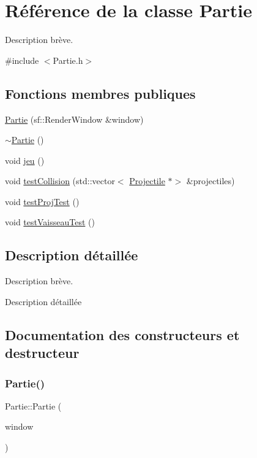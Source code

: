 \hypertarget{class_partie}{}\section{Référence de la classe Partie}
\label{class_partie}


Description brève.  




{\ttfamily \#include $<$Partie.\+h$>$}

\subsection*{Fonctions membres publiques}
\begin{DoxyCompactItemize}
\item 
\hyperlink{class_partie_a4ff8a252d0ca57f42abb2285cf5ad2e0}{Partie} (sf\+::\+Render\+Window \&window)
\item 
\hyperlink{class_partie_ae4afeb7336bb84427272cfb7018b5e3d}{$\sim$\+Partie} ()
\item 
void \hyperlink{class_partie_a38d54358098b3e5e47d0059a37bff5ea}{jeu} ()
\item 
void \hyperlink{class_partie_aae0457a6d531a2c2da83463a7fa66574}{test\+Collision} (std\+::vector$<$ \hyperlink{class_projectile}{Projectile} $\ast$$>$ \&projectiles)
\item 
void \hyperlink{class_partie_a6f27ab32773454f2d44a1cf3ef95ba47}{test\+Proj\+Test} ()
\item 
void \hyperlink{class_partie_ad9ed353f340b606840fe4053ab7b6bf3}{test\+Vaisseau\+Test} ()
\end{DoxyCompactItemize}


\subsection{Description détaillée}
Description brève. 

Description détaillée 

\subsection{Documentation des constructeurs et destructeur}
\mbox{\label{class_partie_a4ff8a252d0ca57f42abb2285cf5ad2e0}} 
\subsubsection{\texorpdfstring{Partie()}{Partie()}}
{\footnotesize\ttfamily Partie\+::\+Partie (\begin{DoxyParamCaption}\item[{sf\+::\+Render\+Window \&}]{window }\end{DoxyParamCaption})}

